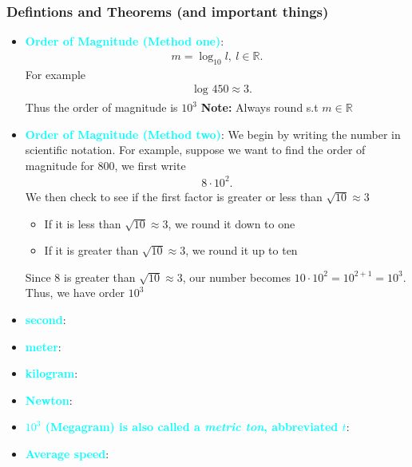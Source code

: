 \documentclass{report}
\begin{document}
    \pagebreak 
    \subsubsection{Defintions and Theorems (and important things)}
    \begin{itemize}
        \item \textbf{\textcolor{cyan}{Order of Magnitude (Method one)}}:
            \begin{align*}
                m = \log_{10}{l},\ l \in \mathbb{R}
            .\end{align*}
            For example
            \begin{align*}
                &\log_{}{450} \approx 3
            .\end{align*}
            Thus the order of magnitude is $10^{3}$
            \bigbreak \noindent 
            \textbf{Note:} Always round s.t $m \in \mathbb{R}$ 
        \item \textbf{\textcolor{cyan}{Order of Magnitude (Method two)}}: We begin by writing the number in scientific notation. For example, suppose we want to find the order of magnitude for $800$, we first write 
            \begin{align*}
                8 \cdot 10^{2}
            .\end{align*}
            We then check to see if the first factor is greater or less than $\sqrt{10} \approx 3$
            \begin{itemize}
                \item If it is less than $\sqrt{10} \approx  3$, we round it down to one
                \item If it is greater than $\sqrt{10} \approx  3$, we round it up to ten
            \end{itemize}
            Since 8 is greater than $\sqrt{10} \approx  3$, our number becomes $10 \cdot 10^{2} = 10^{2+1} = 10^{3}$. Thus, we have order $10^{3}$
        \item \textbf{\textcolor{cyan}{second}}:
        \item \textbf{\textcolor{cyan}{meter}}:
        \item \textbf{\textcolor{cyan}{kilogram}}:
        \item \textbf{\textcolor{cyan}{Newton}}:
        \item \textbf{\textcolor{cyan}{$10^{3}$ (Megagram) is also called a \textit{metric ton}, abbreviated $t$}}:
        \item \textbf{\textcolor{cyan}{Average speed}}:

\end{itemize}
\end{document}
